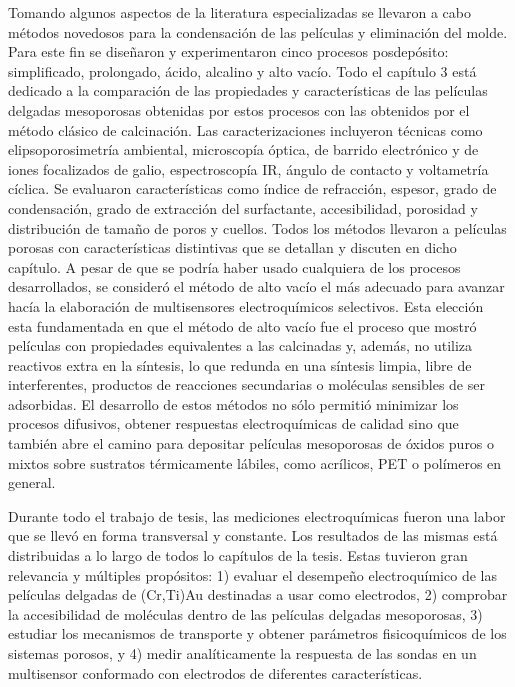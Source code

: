  Tomando algunos aspectos de la literatura especializadas se llevaron a cabo métodos novedosos para la condensación de las películas y eliminación del molde. Para este fin se diseñaron y experimentaron cinco procesos posdepósito: simplificado, prolongado, ácido, alcalino y alto vacío. Todo el capítulo 3 está dedicado a la comparación de las propiedades y características de las películas delgadas mesoporosas obtenidas por estos procesos con las obtenidos por el método clásico de calcinación. Las caracterizaciones incluyeron técnicas como elipsoporosimetría ambiental, microscopía óptica, de barrido electrónico y de iones focalizados de galio, espectroscopía IR, ángulo de contacto y voltametría cíclica. Se evaluaron características como índice de refracción, espesor, grado de condensación, grado de extracción del surfactante, accesibilidad, porosidad y distribución de tamaño de poros y cuellos. Todos los métodos llevaron a películas porosas con características distintivas que se detallan y discuten en dicho capítulo. A pesar de que se podría haber usado cualquiera de los procesos desarrollados, se consideró el método de alto vacío el más adecuado para avanzar hacía la elaboración de multisensores electroquímicos selectivos. Esta elección esta fundamentada en que el método de alto vacío fue el proceso que mostró películas con propiedades equivalentes a las calcinadas y, además, no utiliza reactivos extra en la síntesis, lo que redunda en una síntesis limpia, libre de interferentes, productos de reacciones secundarias o moléculas sensibles de ser adsorbidas. El desarrollo de estos métodos no sólo permitió minimizar los procesos difusivos, obtener respuestas electroquímicas de calidad sino que también abre el camino para depositar películas mesoporosas de óxidos puros o mixtos sobre sustratos térmicamente lábiles, como acrílicos, PET o polímeros en general.

 Durante todo el trabajo de tesis, las mediciones electroquímicas fueron una labor que se llevó en forma transversal y constante. Los resultados de las mismas está distribuidas a lo largo de todos lo capítulos de la tesis. Estas tuvieron gran relevancia y múltiples propósitos: 1) evaluar el desempeño electroquímico de las películas delgadas de (Cr,Ti)\textbar Au destinadas a usar como electrodos, 2) comprobar la accesibilidad de moléculas dentro de las películas delgadas mesoporosas, 3) estudiar los mecanismos de transporte y obtener parámetros fisicoquímicos de los sistemas porosos, y 4) medir analíticamente la respuesta de las sondas en un multisensor conformado con electrodos de diferentes características.

